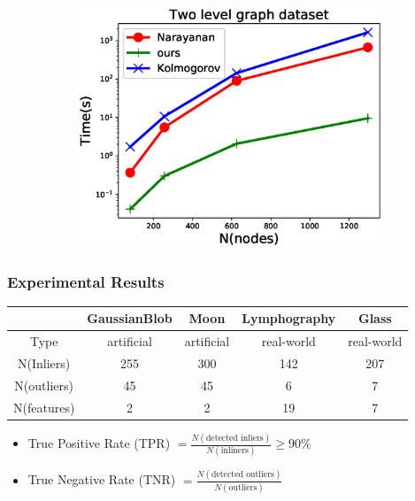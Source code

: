 \documentclass[notheorems]{beamer}
\begin{document}
\begin{frame}
\begin{figure}
\begin{subfigure}{0.4\textwidth}
	\end{subfigure}~
	\begin{subfigure}{0.4\textwidth}
		\includegraphics[width=\textwidth]{pic/time_complexity_two_level.eps}
	\end{subfigure}
\end{figure} 
\end{frame}
\begin{frame}
	\frametitle{Experimental Results}
\begin{table}
\centering
\begin{tabular}{ccccc}
\hline
              &  GaussianBlob   &      Moon       &  Lymphography  &     Glass     \\
\hline
   Type    & artificial & artificial & real-world & real-world \\
   N(Inliers) & 255  & 300 & 142  & 207 \\
   N(outliers)   & 45 &  45  & 6 & 7 \\
   N(features)   & 2 &  2  & 19 & 7  \\
\hline
\end{tabular}
\end{table}
\begin{itemize}
\item True Positive Rate (TPR)  $=\frac{N(\textrm{detected inliers})}{N(\textrm{inliners})} \geq 90\% $
\item True Negative Rate (TNR) $=\frac{N(\textrm{detected outliers})}{N(\textrm{outliers})}$
\end{itemize}
\begin{table}
\centering
{\scriptsize

}
\end{table}

\end{frame}	
\end{document}
